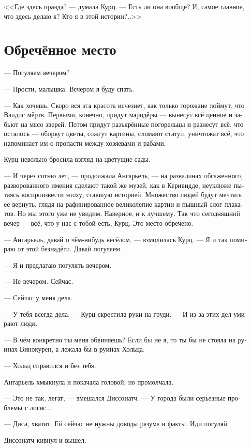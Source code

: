 \documentclass[a4paper,12pt,fleqn]{book}\usepackage{polyglossia}\setdefaultlanguage[babelshorthands=true]{russian}\setotherlanguage{english}\defaultfontfeatures{Ligatures=TeX,Mapping=tex-text}\usepackage{xcolor}\newcommand{\ml}[3]{#2}
\begin{document}
<<Где здесь правда? --- думала Курц.
--- Есть ли она вообще?
И, самое главное, что здесь делаю я?
Кто я в этой истории?..>>

\section{Обречённое место}

--- Погуляем вечером?

--- Прости, малышка.
Вечером я буду спать.

--- Как хочешь.
Скоро вся эта красота исчезнет, как только горожане поймут, что Валдис мёртв.
Первыми, конечно, придут мародёры --- вынесут всё ценное и забьют на мясо зверей.
Потом придут разъярённые погорельцы и разнесут всё, что осталось --- оборвут цветы, сожгут картины, сломают статуи, уничтожат всё, что напоминает им о пропасти между хозяевами и рабами.

Курц невольно бросила взгляд на цветущие сады.

--- И через сотню лет, --- продолжала Ангарьель, --- на развалинах обгаженного, разворованного имения сделают такой же музей, как в Керивидде, неуклюже пытаясь воспроизвести эпоху, ставшую историей.
Множество людей будут мечтать её вернуть, глядя на рафинированное великолепие картин и пышный слог плакатов.
Но мы этого уже не увидим.
Наверное, и к лучшему.
Так что сегодняшний вечер --- всё, что у нас с тобой есть, Курц.
Это место обречено.

--- Ангарьель, давай о чём-нибудь весёлом, --- взмолилась Курц.
--- Я и так помираю от этой безнадёги.
Давай погуляем.

--- Я и предлагаю погулять вечером.

--- Не вечером.
Сейчас.

--- Сейчас у меня дела.

--- У тебя всегда дела, --- Курц скрестила руки на груди.
--- И из-за этих дел умирают люди.

--- В чём конкретно ты меня обвиняешь?
Если бы не я, то ты бы не стояла на руинах Винокурен, а лежала бы в руинах Хольца.

--- Хольц справился и без тебя.

Ангарьель хмыкнула и покачала головой, но промолчала.

--- Это не так, легат, --- вмешался Диссонатч.
--- У города были серьезные проблемы с логис...

--- Диса, хватит.
Ей сейчас не нужны доводы разума и факты.
Иди погуляй.

Диссонатч кивнул и вышел.
\end{document}

